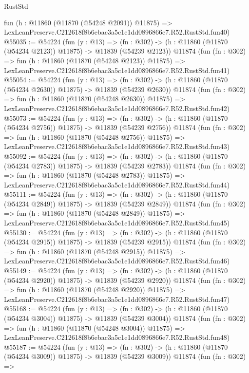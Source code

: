 \begin{lexlean}{RustStd}
\begin{coremodule}
    fun (h : @11860 (@11870 (@54248 @2091)) @11875) =>
    LexLeanPreserve.C212618f8b6ebac3a5c1e1dd0896866e7.R52.RustStd.fun40)
@55035 := @54224
    (fun (y : @13) =>
    (fn : @302) -> (h : @11860 (@11870 (@54234 @2123)) @11875) -> @11839 (@54239 @2123))
    @11874
    (fun (fn : @302) =>
    fun (h : @11860 (@11870 (@54248 @2123)) @11875) =>
    LexLeanPreserve.C212618f8b6ebac3a5c1e1dd0896866e7.R52.RustStd.fun41)
@55054 := @54224
    (fun (y : @13) =>
    (fn : @302) -> (h : @11860 (@11870 (@54234 @2630)) @11875) -> @11839 (@54239 @2630))
    @11874
    (fun (fn : @302) =>
    fun (h : @11860 (@11870 (@54248 @2630)) @11875) =>
    LexLeanPreserve.C212618f8b6ebac3a5c1e1dd0896866e7.R52.RustStd.fun42)
@55073 := @54224
    (fun (y : @13) =>
    (fn : @302) -> (h : @11860 (@11870 (@54234 @2756)) @11875) -> @11839 (@54239 @2756))
    @11874
    (fun (fn : @302) =>
    fun (h : @11860 (@11870 (@54248 @2756)) @11875) =>
    LexLeanPreserve.C212618f8b6ebac3a5c1e1dd0896866e7.R52.RustStd.fun43)
@55092 := @54224
    (fun (y : @13) =>
    (fn : @302) -> (h : @11860 (@11870 (@54234 @2783)) @11875) -> @11839 (@54239 @2783))
    @11874
    (fun (fn : @302) =>
    fun (h : @11860 (@11870 (@54248 @2783)) @11875) =>
    LexLeanPreserve.C212618f8b6ebac3a5c1e1dd0896866e7.R52.RustStd.fun44)
@55111 := @54224
    (fun (y : @13) =>
    (fn : @302) -> (h : @11860 (@11870 (@54234 @2849)) @11875) -> @11839 (@54239 @2849))
    @11874
    (fun (fn : @302) =>
    fun (h : @11860 (@11870 (@54248 @2849)) @11875) =>
    LexLeanPreserve.C212618f8b6ebac3a5c1e1dd0896866e7.R52.RustStd.fun45)
@55130 := @54224
    (fun (y : @13) =>
    (fn : @302) -> (h : @11860 (@11870 (@54234 @2915)) @11875) -> @11839 (@54239 @2915))
    @11874
    (fun (fn : @302) =>
    fun (h : @11860 (@11870 (@54248 @2915)) @11875) =>
    LexLeanPreserve.C212618f8b6ebac3a5c1e1dd0896866e7.R52.RustStd.fun46)
@55149 := @54224
    (fun (y : @13) =>
    (fn : @302) -> (h : @11860 (@11870 (@54234 @2920)) @11875) -> @11839 (@54239 @2920))
    @11874
    (fun (fn : @302) =>
    fun (h : @11860 (@11870 (@54248 @2920)) @11875) =>
    LexLeanPreserve.C212618f8b6ebac3a5c1e1dd0896866e7.R52.RustStd.fun47)
@55168 := @54224
    (fun (y : @13) =>
    (fn : @302) -> (h : @11860 (@11870 (@54234 @3004)) @11875) -> @11839 (@54239 @3004))
    @11874
    (fun (fn : @302) =>
    fun (h : @11860 (@11870 (@54248 @3004)) @11875) =>
    LexLeanPreserve.C212618f8b6ebac3a5c1e1dd0896866e7.R52.RustStd.fun48)
@55187 := @54224
    (fun (y : @13) =>
    (fn : @302) -> (h : @11860 (@11870 (@54234 @3009)) @11875) -> @11839 (@54239 @3009))
    @11874
    (fun (fn : @302) =>

\end{coremodule}
\end{lexlean}
